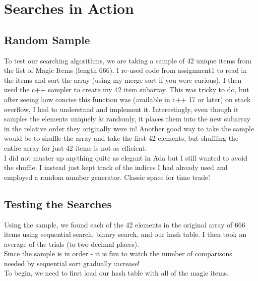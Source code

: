 \documentclass[letterpaper, 10pt]{article}
\begin{document}
\section{Searches in Action}
\subsection{Random Sample} 
To test our searching algorithms, we are taking a sample of 42 unique items from the list of Magic Items (length 666). I re-used code from assignment1 to read in the items and sort the array (using my merge sort if you were curious). I then used the c++ sampler to create my 42 item subarray. This was tricky to do, but after seeing how concise this function was (available in c++ 17 or later) on stack overflow, I had to understand and implement it. Interestingly, even though it samples the elements uniquely \& randomly, it places them into the new subarray in the relative order they originally were in! Another good way to take the sample would be to shuffle the array and take the first 42 elements, but shuffling the entire array for just 42 items is not as efficient. \\
I did not muster up anything quite as elegant in Ada but I still wanted to avoid the shuffle. I instead just kept track of the indices I had already used and employed a random number generator. Classic space for time trade! \\ 
\newpage


\newpage
\subsection{Testing the Searches} 
Using the sample, we found each of the 42 elements in the original array of 666 items using sequential search, binary search, and our hash table. I then took an average of the trials (to two decimal places). \\ 
Since the sample is in order - it is fun to watch the number of comparisons needed by sequential sort gradually increase! \\
To begin, we need to first load our hash table with all of the magic items.


 
\end{document}
